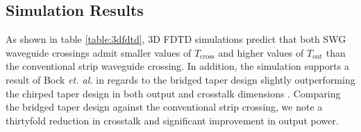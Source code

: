 \documentclass[aps,prl,twocolumn, superscriptaddress]{revtex4}
\begin{document}
\vspace{-1em}
\subsection{Simulation Results}

As shown in table \ref{table:3dfdtd}, 3D FDTD simulations predict that both SWG waveguide crossings admit smaller values of $T_{\text{cross}}$ and higher values of $T_\text{out}$ than the conventional strip waveguide crossing. In addition, the simulation supports a result of Bock \textit{et. al.} in regards to the bridged taper design slightly outperforming the chirped taper design in both output and crosstalk dimensions \cite{BockPaper}. Comparing the bridged taper design against the conventional strip crossing, we note a thirtyfold reduction in crosstalk and significant improvement in output power.
\end{document}
